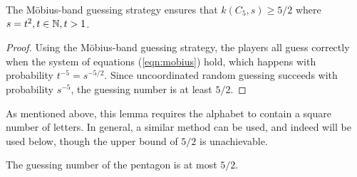 \begin{lemma}
 \label{lem:mobius-lower-bound}
 The M{\"o}bius-band guessing strategy ensures that $k(C_5, s) \geq 5/2$ where $s = t^2, t \in \mathbb{N}, t > 1$.
\end{lemma}

\begin{proof}
 Using the M{\"o}bius-band guessing strategy, the players all guess correctly when the system of equations (\ref{eqn:mobius}) hold, which happens with probability $t^{-5} = s^{-5/2}$. Since uncoordinated random guessing succeeds with probability $s^{-5}$, the guessing number is at least $5/2$.
\end{proof}

As mentioned above, this lemma requires the alphabet to contain a square number of letters. In general, a similar method can be used, and indeed will be used below, though the upper bound of $5/2$ is unachievable.

\begin{lemma}
 \label{lem:mobius-upper-bound}
 The guessing number of the pentagon is at most $5/2$.
\end{lemma}

